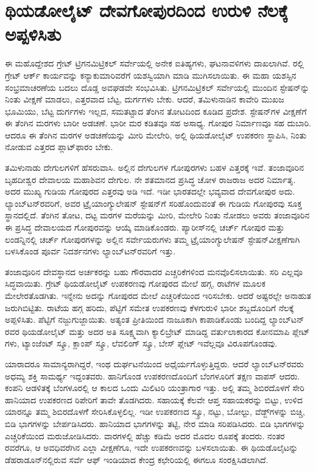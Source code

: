 
\chapter{ಥಿಯಡೋಲೈಟ್​ ದೇವಗೋಪುರದಿಂದ ಉರುಳಿ ನೆಲಕ್ಕೆ ಅಪ್ಪಳಿಸಿತು}

ಈ ಮಹೊದ್ದೇಶದ ಗ್ರೇಟ್​ ಟ್ರಿಗನಮಿಟ್ರಿಕಲ್​ ಸರ್ವೇಯಲ್ಲಿ ಅನೇಕ ಐತಿಹ್ಯಗಳು, ಘಟನಾವಳಿಗಳು ದಾಖಲಾಗಿವೆ. ರಲ್ಲಿ ಗ್ರೇಟ್​ ಆರ್ಕ್ ಕಾರ್ಯವನ್ನು ಕನ್ಯಾಕುಮಾರಿವರೆಗೆ ಯಶಸ್ವಿಯಾಗಿ ಮಾಡಿ ಮುಗಿಸಲಾಯಿತು. ಈ ಮಹಾ ಯಶಸ್ಸಿನ ಸಂಭ್ರಮಾಚರಣೆಯ ಬದಲು ದೊಡ್ಡ ಅವಘಡವೇ ಸಂಭವಿಸಿತು. ಟ್ರಿಗನಮಿಟ್ರಿಕಲ್​ ಸರ್ವೇಯಲ್ಲಿ ಮುಂದಿನ ಸ್ಟೇಷನ್​ನ್ನು ನಿಂತು ವೀಕ್ಷಣೆ ಮಾಡಲು, ಎತ್ತರವಾದ ಬೆಟ್ಟ, ದುರ್ಗಗಳು ಬೇಕು. ಆದರೆ, ತಮಿಳುನಾಡಿನ ಕಾವೇರಿ ಮುಖಜ ಭೂಮಿಯು, ಬೆಟ್ಟ ದುರ್ಗಗಳು ಇಲ್ಲದ, ಸಮತಟ್ಟಾದ ತೆಂಗಿನ ತೋಟದಿಂದ ಕೂಡಿದ ಪ್ರದೇಶ. ಸ್ಟೇಷನ್​ಗಳ ವೀಕ್ಷಣೆಗೆ ಈ ತೆಂಗಿನ ಮರಗಳು ಬಾರೀ ಅಡಚಣೆ. ಭಾರೀ ಮರ ಕಡಿತವೂ ಸಹ ಅಸಾಧ್ಯ. ಗೋಪುರ ನಿರ್ಮಾಣವೂ ಸಹ ದುಬಾರಿ. ಆದರೂ ಈ ತೆಂಗಿನ ಮರಗಳ ಅಡಚಣೆಯನ್ನು ಮೀರಿ ಮೇಲೇರಿ, ಅಲ್ಲಿ ಥಿಯಡೋಲೈಟ್​ ಉಪಕರಣ ಸ್ಥಾಪಿಸಿ, ನಿಂತು ನೋಡುವ ಎತ್ತರದ ಪ್ಲಾಟ್​ಫಾರಂ ಬೇಕು.

ತಮಿಳುನಾಡು ದೇಗುಲಗಳಿಗೆ ಹೆಸರುವಾಸಿ. ಅಲ್ಲಿನ ದೇಗುಲಗಳ ಗೋಪುರಗಳು ಬಹಳ ಎತ್ತರಕ್ಕೆ ಇವೆ. ತಂಜಾವೂರಿನ ಬೃಹದೀಶ್ವರ ದೇವಾಲಯ ಮಹಾಶಿವನ ದೇಗುಲ. ನೇ ಶತಮಾನದ ಪ್ರಸಿದ್ಧ ಚೋಳ ರಾಜರಾಜ ಅದರ ನಿರ್ಮಾತೃ. ಅದರ ಮುಖ್ಯ ಗುಡಿಯ ಗೋಪುರದ ಎತ್ತರವು  ಅಡಿ ಇದೆ. ಇಡೀ ಭಾರತದಲ್ಲೇ ಭವ್ಯವಾದ ದೇವಗೋಪುರ ಅದು. ಲ್ಯಾಂಬ್​ಟನ್​ರವರಿಗೆ, ಅವರ ಟ್ರೈಯಾಂಗ್ಯುಲೇಷನ್​ ಸ್ಟೇಷನ್​ಗೆ ಸರಿಹೊಂದುವಂತೆ ಈ ಗುಡಿಯ ಗೋಪುರವು ಸೂಕ್ತ ಸ್ಥಾನದಲ್ಲಿದೆ. ತೆಂಗಿನ ತೋಟ, ದಟ್ಟ ಮರಗಳ ಮರೆಯನ್ನು ಮೀರಿ, ಮೇಲೇರಿ ನಿಂತು ನೋಡಲು ಅವರು ತಂಜಾವೂರಿನ ಈ ಪ್ರಸಿದ್ಧ ದೇವಾಲಯದ ಗೋಪುರವನ್ನು ಆಯ್ಕೆ ಮಾಡಿಕೊಂಡರು. ಪ್ಯಾರೀಸ್​ನಲ್ಲಿ ಚರ್ಚ್ ಗೋಪುರ ಮತ್ತು ಲಂಡನ್ನಿನಲ್ಲಿ ಚರ್ಚ್ ಗೋಪುರಗಳನ್ನು ಅಲ್ಲಿನ ಸರ್ವೇಯರುಗಳು ತಮ್ಮ ಟ್ರೈಯಾಂಗ್ಯುಲೇಷನ್​ ಸ್ಟೇಷನ್​ ವೀಕ್ಷಣೆಗಾಗಿ ಬಳಸಿಕೊಂಡ ಪೂರ್ವ ನಿದರ್ಶನಗಳು ಲ್ಯಾಂಬ್​ಟನ್​ರವರಿಗೆ ಇತ್ತು.

ತಂಜಾವೂರಿನ ದೇವಸ್ಥಾನದ ಅರ್ಚಕರನ್ನು ಬಹು ಗೌರವಾದರ ಎಚ್ಚರಿಕೆಗಳಿಂದ ಮನವೊಲಿಸಲಾಯಿತು. ಸರಿ ಎಲ್ಲವೂ ಸಿದ್ಧವಾಯಿತು. ಗ್ರೇಟ್​ ಥಿಯಡೋಲೈಟ್​ ಉಪಕರಣವು ಗೋಪುರದ ಮೇಲೆ ಹಗ್ಗ, ರಾಟೆಗಳ ಮೂಲಕ ಮೇಲೇರತೊಡಗಿತು. ಇನ್ನೇನು ಅದನ್ನು ಗೋಪುರದ ಮೇಲೆ ಎಚ್ಚರಿಕೆಯಿಂದ ಇರಿಸಬೇಕು. ಆದರೆ ಅಷ್ಟರಲ್ಲೇ ಅನಾಹುತ ಜರುಗಿಬಿಟ್ಟಿತು. ರಾಟೆಯ ಹಗ್ಗ ಹರಿದು, ಪೆಟ್ಟಿಗೆ ಸಮೇತ ಉಪಕರಣವು ಕೆಳಗುರುಳಿ ಭಾರೀ ಶಬ್ದದೊಂದಿಗೆ ನೆಲಕ್ಕೆ ಅಪ್ಪಳಿಸಿತು. ಪೆಟ್ಟಿಗೆ ನಜ್ಜುಗುಜ್ಜಾಯಿತು. ಅತ್ಯಂತ ಪ್ರೀತಿಯಿಂದ ನಾಜೂಕಾಗಿ ಕಾಪಾಡಿಕೊಂಡು ಬಂದಿದ್ದ ಲ್ಯಾಂಬ್​ಟನ್​ರವರ ಥಿಯಡೋಲೈಟ್​ ಮತ್ತು ಅದರ ಅತಿ ಸೂಕ್ಷ್ಮವಾಗಿ ಕ್ಯಾಲಿಬ್ರೇಟ್​ ಮಾಡಿದ್ದ ವರ್ತುಲಾಕಾರದ ಕೋನಮಾಪಿ ಪ್ಲೇಟ್​ಗಳು, ಟ್ಯಾಂಜೆಂಟ್​ ಸ್ಕ್ರೂ, ಕ್ಲಾಂಪ್​ ಸ್ಕ್ರೂ, ಲೆವಲಿಂಗ್​ ಸ್ಕ್ರೂ, ಬೇಸ್​ ಪ್ಲೇಟ್​ ಇವೆಲ್ಲವೂ ವಿರೂಪಗೊಂಡವು.

ಯಾರಾದರೂ ಸಾಮಾನ್ಯರಾಗಿದ್ದರೆ, ಇಂಥ ದುರ್ಘಟನೆಯಿಂದ ಅಧೈರ್ಯಗೊಳ್ಳುತ್ತಿದ್ದರು. ಆದರೆ ಲ್ಯಾಂಬ್​ಟನ್​ರವರು ಅಧಮ್ಯ ಶಕ್ತಿ ಸಾಮರ್ಥ್ಯ ಇದ್ದಂತವರು. ಹಾನಿಗೊಂಡ ಉಪಕರಣದೊಂದಿಗೆ ಬೆಂಗಳೂರಿಗೆ ತಕ್ಷಣ ವಾಪಸ್​ ಆದರು. ಕಂಪನಿ ಆಡಳಿತಕ್ಕೆ ಬೆಂಗಳೂರಲ್ಲಿ ಆ ಕಾಲದ ಒಂದು ಮಿಲಿಟರಿ ಯಂತ್ರಾಗಾರ ಇತ್ತು. ಅಲ್ಲಿ ತಮ್ಮ ಶಿಬಿರದೊಳಗೆ ಸೇರಿ ಹಾನಿಯಾದ ಉಪಕರಣದ ರಿಪೇರಿಗೆ ತಾವೇ ತೊಡಗಿದರು. ಸಹಾಯಕ್ಕೆ ಕೆಲವೇ ಆಪ್ತ ಸಹಾಯಕರನ್ನು ಬಿಟ್ಟು, ಉಳಿದ ಯಾರನ್ನೂ ತಮ್ಮ ಶಿಬಿರದೊಳಗೆೆ ಸೇರಿಸಿಕೊಳ್ಳಲಿಲ್ಲ. ಇಡೀ ಉಪಕರಣದ ಸ್ಕ್ರೂ, ನಟ್ಟು, ಬೋಲ್ಟು, ವೆಡ್ಜ್​ಗಳನ್ನು ಬಿಚ್ಚಿ, ಬಿಡಿ ಭಾಗಗಳನ್ನು ಬೇರ್ಪಡಿಸಿದರು. ಹಾನಿಯಾದ ಭಾಗಗಳನ್ನು ತಟ್ಟಿ, ನೇರ ಮಾಡಿ ಸರಿಪಡಿಸಿದರು. ಬಿಡಿ ಭಾಗಗಳನ್ನು ಎಚ್ಚರಿಕೆಯಿಂದ ಮರುಜೋಡಿಸಿದರು.  ವಾರಗಳಲ್ಲಿ ಹೆಚ್ಚು ಕಡಿಮೆ ಅದರ ಮೊದಲ ರೂಪಕ್ಕೆ ತಂದರು. ನಂತರ  ರವರೆಗೂ, ಆ ಅವಧಿವರೆಗಿನ ಎಲ್ಲಾ ವೀಕ್ಷಣೆಗೂ, ಇದೇ ಉಪಕರಣವನ್ನು ಬಳಸಲಾಯಿತು. ಈ ಥಿಯಡೊಲೈಟನ್ನು ಡೆಹರಾಡೂನ್​ನಲ್ಲಿರುವ ಸರ್ವೆ ಆಫ್​ ಇಂಡಿಯಾದ ಕೇಂದ್ರ ಕಛೇರಿಯಲ್ಲಿ ಈಗಲೂ ಸಂರಕ್ಷಿಸಿಡಲಾಗಿದೆ.

